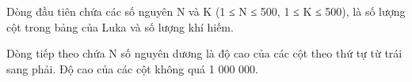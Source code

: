 Dòng đầu tiên chứa các số nguyên N và K (1 ≤ N ≤ 500, 1 ≤ K ≤ 500), là số lượng cột trong bảng của Luka và số lượng khí hiếm.  

   Dòng tiếp theo chứa N số nguyên dương là độ cao của các cột theo thứ tự từ trái sang phải. Độ cao của các cột không quá 1 000 000.